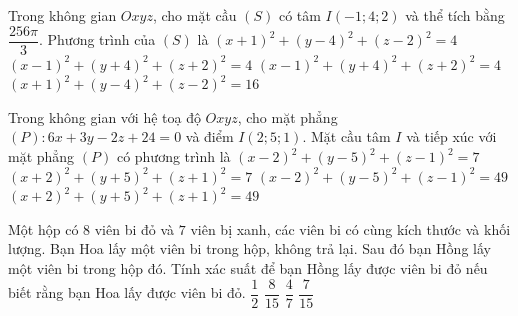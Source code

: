\begin{ex}%
	Trong không gian $O x y z$, cho mặt cầu $(S)$ có tâm $I(-1 ; 4 ; 2)$ và thể tích bằng $\dfrac{256 \pi}{3}$. Phương trình của $(S)$ là
	\choice
	{$(x+1)^{2}+(y-4)^{2}+(z-2)^{2}=4$}
	{$(x-1)^{2}+(y+4)^{2}+(z+2)^{2}=4$}
	{$(x-1)^{2}+(y+4)^{2}+(z+2)^{2}=4$}
	{\True $(x+1)^{2}+(y-4)^{2}+(z-2)^{2}=16$}
\end{ex}

\begin{ex}%
	Trong không gian với hệ toạ độ $Oxyz$, cho mặt phẳng $(P) \colon 6x+3y-2z+24=0$ và điểm $I(2;5;1)$. Mặt cầu tâm $I$ và tiếp xúc với mặt phẳng $(P)$ có phương trình là
	\choice
	{$(x-2)^2+(y-5)^2+(z-1)^2=7$}
	{$(x+2)^2+(y+5)^2+(z+1)^2=7$}
	{\True $(x-2)^2+(y-5)^2+(z-1)^2=49$}
	{$(x+2)^2+(y+5)^2+(z+1)^2=49$}
\end{ex}

\begin{ex}%
	Một hộp có $8$ viên bi đỏ và $7$ viên bị xanh, các viên bi có cùng kích thước và khối lượng. Bạn Hoa lấy một viên bi trong hộp, không trả lại. Sau đó bạn Hồng lấy một viên bi trong hộp đó. Tính xác suất để bạn Hồng lấy được viên bi đỏ nếu biết rằng bạn Hoa lấy được viên bi đỏ.
	\choice
	{\True $\dfrac{1}{2}$}
	{$\dfrac{8}{15}$}
	{$\dfrac{4}{7}$}
	{$\dfrac{7}{15}$}
\end{ex}

